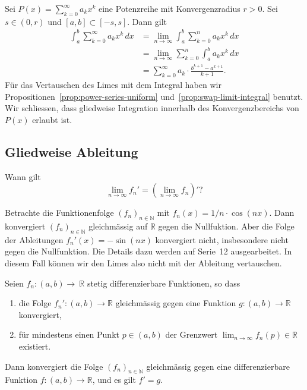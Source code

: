 \documentclass[../main.tex]{subfiles}
\begin{document}
\begin{example}
  Sei $P(x) = \sum_{k=0}^{\infty} a_k x^k$ eine Potenzreihe mit Konvergenzradius $r > 0$.
  Sei $s \in (0, r)$ und $[a, b] \subset [-s, s]$. Dann gilt
  \begin{align*}
    \int_{a}^{b} \sum_{k=0}^{\infty}  a_k x^k \, dx 
    &= \lim_{n \to \infty} \int_{a}^{b} \sum_{k=0}^{n} a_k x^k \, dx  \\
    &=  \lim_{n \to \infty} \sum_{k=0}^{n} \int_{a}^{b} a_k x^k \, dx \\
    &= \sum_{k=0}^{\infty} a_k \cdot \frac{b^{k+1} - a^{k+1}}{k+1}.
  \end{align*}
  Für das Vertauschen des Limes mit dem Integral haben wir 
  Propositionen~\ref{prop:power-series-uniform} und~\ref{prop:swap-limit-integral} benutzt.
  Wir schliessen, dass gliedweise Integration innerhalb des Konvergenzbereichs
  von $P(x)$ erlaubt ist.
\end{example}

\subsection*{Gliedweise Ableitung}
\begin{question}
  Wann gilt
  \[
    \lim_{n \to \infty} f_n' = \left(\lim_{n \to \infty} f_n \right)'?
  \]
\end{question}

\begin{example}
  Betrachte die Funktionenfolge ${(f_{n})}_{n \in \mathbb{N}}$ mit
  $f_n(x) = 1/n \cdot \cos(nx)$.
  Dann konvergiert ${(f_{n})}_{n \in \mathbb{N}}$ gleichmässig auf $\mathbb{R}$ 
  gegen die Nullfuktion. Aber
  die Folge der Ableitungen $f_n'(x) = -\sin (nx)$ konvergiert nicht,
  insbesondere nicht gegen die Nullfunktion.
  Die Details dazu werden auf Serie~12 ausgearbeitet.
  In diesem Fall können wir den Limes also nicht mit der Ableitung vertauschen.
\end{example}

\begin{proposition}\label{prop:derivative-uniform}
  Seien $f_n \colon (a, b) \to~\mathbb{R}$ stetig differenzierbare
  Funktionen, so dass
  \begin{enumerate}[\normalfont(i)]
    \item die Folge $f_n' \colon (a, b) \to \mathbb{R}$ gleichmässig gegen
      eine Funktion $g \colon (a, b) \to \mathbb{R}$ konvergiert,
    \item für mindestens einen Punkt $p \in (a, b)$ der Grenzwert
      $\lim_{n \to \infty} f_n(p) \in \mathbb{R}$ existiert.
  \end{enumerate}
  Dann konvergiert die Folge  ${(f_{n})}_{n \in \mathbb{N}}$ gleichmässig
  gegen eine differenzierbare Funktion $f \colon (a, b) \to \mathbb{R}$,
  und es gilt $f' = g$.
\end{proposition}
\end{document}
